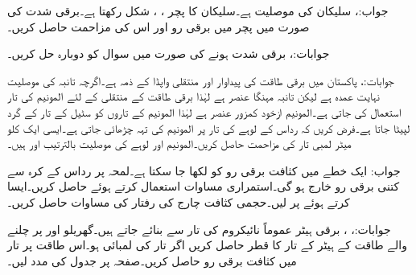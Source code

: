 جواب:، 
سلیکان کی موصلیت  ہے۔سلیکان کا پچر ، ،  شکل رکھتا ہے۔برقی شدت   کی صورت میں پچر میں برقی رو اور اس کی مزاحمت حاصل کریں۔

جوابات:، 
برقی شدت  ہونے کی صورت میں سوال  کو دوبارہ حل کریں۔

جوابات:، 
پاکستان میں برقی طاقت کی پیداوار اور منتقلی واپڈا کے ذمہ ہے۔اگرچہ تانبہ کی موصلیت نہایت عمدہ ہے لیکن تانبہ مہنگا عنصر ہے لہٰذا برقی طاقت کے منتقلی کے لئے المونیم کی تار استعمال کی جاتی ہے۔المونیم ازخود کمزور عنصر ہے لہٰذا المونیم کے تاروں کو سٹیل کے تار کے گرد لپیٹا جاتا ہے۔فرض کریں کہ   رداس کے لوہے کی تار پر  المونیم کی تہہ چڑھائی جاتی ہے۔ایسی ایک کلو میٹر لمبی تار کی مزاحمت حاصل کریں۔المونیم اور لوہے کی موصلیت بالترتیب  اور  ہیں۔
   
جواب:
ایک خطے میں کثافت برقی رو کو  لکھا جا سکتا ہے۔لمحہ  پر رداس  کے کرہ سے کتنی برقی رو خارج ہو گی۔استمراری مساوات  استعمال کرتے ہوئے   حاصل کریں۔ایسا کرتے ہوئے  پر  لیں۔حجمی کثافت چارج  کی رفتار کی مساوات حاصل کریں۔

جوابات:، ، 
برقی ہیٹر عموماً نائیکروم کی تار سے بنائے جاتے ہیں۔گھریلو  اور  پر چلنے والے  طاقت کے ہیٹر کے تار کا قطر حاصل کریں اگر تار کی لمبائی  ہو۔اس طاقت پر تار میں کثافت برقی رو حاصل کریں۔صفحہ  پر جدول  کی مدد لیں۔   


